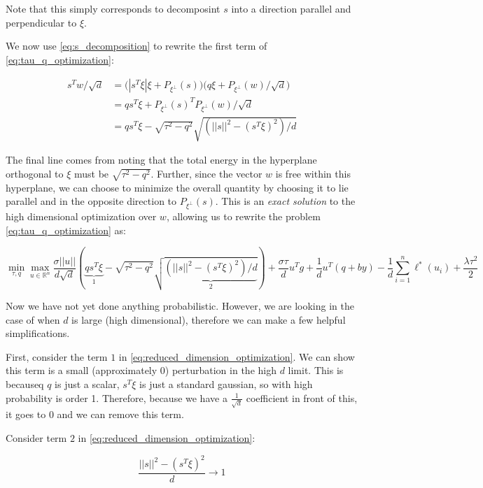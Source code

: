 Note that this simply corresponds to decomposint $s$ into a direction parallel and perpendicular to $\xi$.

We now use \ref{eq:s_decomposition} to rewrite the first term of \ref{eq:tau_q_optimization}:

\begin{align*}
    s^Tw/\sqrt{d} &= \big(|s^T\xi|\xi + P_{\xi^{\perp}}(s) \big)\big(q\xi + P_{\xi^{\perp}}(w)/\sqrt{d}\big) \\
    &= qs^T\xi + P_{\xi^{\perp}}(s)^TP_{\xi^{\perp}}(w)/\sqrt{d} \\
    &= qs^T\xi - \sqrt{\tau^2 - q^2}\sqrt{(||s||^2 - (s^T\xi)^2)/d}
\end{align*}

The final line comes from noting that the total energy in the hyperplane orthogonal to $\xi$ must be $\sqrt{\tau^2-q^2}$. 
Further, since the vector $w$ is free within this hyperplane, we can choose to minimize the overall quantity by choosing it to lie parallel and in the opposite direction to  $P_{\xi^{\perp}}(s)$.
This is an \textit{exact solution} to the high dimensional optimization over $w$, allowing us to rewrite the problem \ref{eq:tau_q_optimization} as:

\begin{equation}\label{eq:reduced_dimension_optimization}
	\min_{\tau, q} \max_{u \in \mathbb{R}^n} 
	\frac{\sigma||u||}{d\sqrt{d}} \left(\underbrace{qs^T\xi}_{1} - \sqrt{\tau^2 - q^2}\sqrt{\underbrace{(||s||^2 - (s^T\xi)^2)/d}_{2}}  \right)+ 
	\frac{\sigma\tau}{d} u^Tg + 
	\frac{1}{d}u^T(q + by) - \frac{1}{d}\sum_{i=1}^n \ell^*(u_i) + \frac{\lambda\tau^2}{2}
\end{equation}

 Now we have not yet done anything probabilistic. However, we are looking in the case of when $d$ is large (high dimensional), therefore we can make a few helpful simplifications. 

 First, consider the term $1$ in \ref{eq:reduced_dimension_optimization}. 
 We can show this term is a small (approximately 0) perturbation in the high $d$ limit.
 This is becauseq $q$ is just a scalar, $s^T\xi$ is just a standard gaussian, so with high probability is order 1. Therefore, because we have a $\frac{1}{\sqrt{d}}$ coefficient in front of this, it goes to $0$ and we can remove this term.
 
 Consider term $2$ in \ref{eq:reduced_dimension_optimization}:
 
 $$\frac{||s||^2 - (s^T\xi)^2}{d} \longrightarrow 1$$
 
